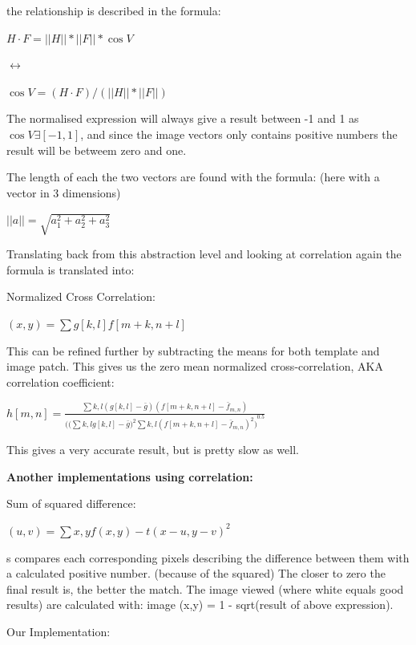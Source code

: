 the relationship is described in the formula:

$H \cdot F = ||H|| * ||F|| * \cos{V}$

\begin{center} 
$\leftrightarrow$
\end{center}

$\cos{V} = (H \cdot F) /(||H|| * ||F||)$

The normalised expression will always give a result between -1 and 1 as
$\cos{V} \exists [-1,1]$, and since the image vectors only contains
positive numbers the result will be betweem zero and one.

The length of each the two vectors are found with the formula: (here
with a vector in 3 dimensions)

$||a|| = \sqrt{a_1^2 + a_2^2 + a_3^2}$

Translating back from this abstraction level and looking at correlation
again the formula is translated into:

Normalized Cross Correlation:

$(x,y) = \sum{g[k,l] f[m+k,n+l]}$

This can be refined further by subtracting the means for both template
and image patch. This gives us the zero mean normalized
cross-correlation, AKA correlation coefficient:

$h[m,n] = \frac{ \sum{k,l}{(g[k,l]-\bar{g})(f[m+k,n+l]-\bar{f}_{m,n})}}{((\sum{k,l}{g[k,l]-\bar{g})^2\sum{k,l}{(f[m+k,n+l]-\bar{f}_{m,n})^2)}^{0.5}}}$

This gives a very accurate result, but is pretty slow as well.

\textbf{Another implementations using correlation:}

Sum of squared difference:

$(u,v)=\sum{x,y}{f(x,y)-t(x-u,y-v)}^2$

s compares each corresponding pixels describing the difference between
them with a calculated positive number. (because of the squared) The
closer to zero the final result is, the better the match. The image
viewed (where white equals good results) are calculated with: image
(x,y) = 1 - sqrt(result of above expression).

Our Implementation:

